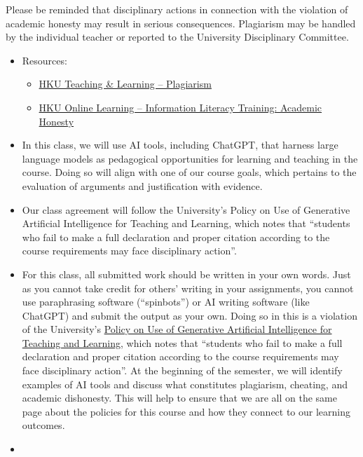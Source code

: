 \documentclass[
  letterpaper,
  DIV=11,
  numbers=noendperiod]{scrartcl}
\providecommand{\tightlist}{%
  \setlength{\itemsep}{0pt}\setlength{\parskip}{0pt}}
\begin{document}
Please be reminded that disciplinary actions in connection with the
violation of academic honesty may result in serious consequences.
Plagiarism may be handled by the individual teacher or reported to the
University Disciplinary Committee.

\begin{itemize}
\item
  Resources:

  \begin{itemize}
  \tightlist
  \item
    \href{https://tl.hku.hk/plagiarism/}{HKU Teaching \& Learning --
    Plagiarism}
  \item
    \href{https://learning.hku.hk/catalog/course/ilt01/}{HKU Online
    Learning -- Information Literacy Training: Academic Honesty}
  \end{itemize}
\item
  In this class, we will use AI tools, including ChatGPT, that harness
  large language models as pedagogical opportunities for learning and
  teaching in the course. Doing so will align with one of our course
  goals, which pertains to the evaluation of arguments and justification
  with evidence.
\item
  Our class agreement will follow the University's Policy on Use of
  Generative Artificial Intelligence for Teaching and Learning, which
  notes that ``students who fail to make a full declaration and proper
  citation according to the course requirements may face disciplinary
  action''.
\item
  For this class, all submitted work should be written in your own
  words. Just as you cannot take credit for others' writing in your
  assignments, you cannot use paraphrasing software (``spinbots'') or AI
  writing software (like ChatGPT) and submit the output as your own.
  Doing so in this is a violation of the University's
  \href{https://intraweb.hku.hk/reserved_1/tlearn/genai/gaitf-policy-dissemination-202309.pdf}{Policy
  on Use of Generative Artificial Intelligence for Teaching and
  Learning}, which notes that ``students who fail to make a full
  declaration and proper citation according to the course requirements
  may face disciplinary action''. At the beginning of the semester, we
  will identify examples of AI tools and discuss what constitutes
  plagiarism, cheating, and academic dishonesty. This will help to
  ensure that we are all on the same page about the policies for this
  course and how they connect to our learning outcomes.
\item

\end{itemize}
\end{document}
